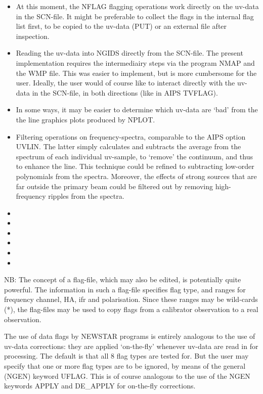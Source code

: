 \begin{itemize}
\item
At this moment, the NFLAG flagging operations work directly on the uv-data
in the SCN-file. It might be preferable to collect the flags in the internal
flag list first, to be copied to the uv-data (PUT) or an external file after
inspection.

\item
Reading the uv-data into NGIDS directly from the SCN-file.
The present implementation requires the intermediairy steps via the program
NMAP and the WMP file. This was easier to implement, but is more cumbersome
for the user. Ideally, the user would of course like to interact directly
with the uv-data in the SCN-file, in both directions (like in AIPS TVFLAG).

\item
In some ways, it may be easier to determine which uv-data are `bad' from the
the line graphics plots produced by NPLOT.

\item
Filtering operations on frequency-spectra, comparable to the AIPS option UVLIN.
The latter simply calculates and subtracts the average from the spectrum of
each individual uv-sample, to `remove' the continuum, and thus to enhance the
line. This technique could be
refined to subtracting low-order polynomials from the spectra.
Moreover, the effects of strong sources that are far outside the primary beam
could be filtered out by removing high-frequency ripples from the spectra.

\item
\item
\item
\item
\item
\item
\end{itemize}


	NB: The concept of a flag-file, which may also be edited, is
potentially quite powerful. The information in such a flag-file
specifies flag type, and ranges for frequency channel, HA, ifr and
polarisation. Since these ranges may be wild-cards (*), the flag-files
may be used to copy flags from a calibrator observation to a real observation.

	The use of data flags by NEWSTAR programs is entirely analogous
to the use of uv-data corrections: they are applied `on-the-fly'
whenever uv-data are read  in for processing. The default is that all
8 flag types are tested for. But the user may specify that one or more
flag types are to be ignored, by means of the general (NGEN) keyword
UFLAG. This is of course analogous to the use of the NGEN keywords
APPLY and DE\_APPLY for on-the-fly corrections.
